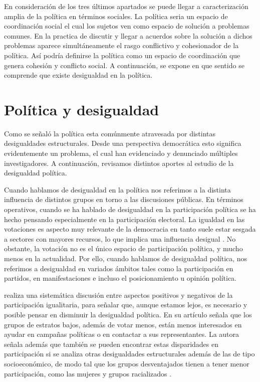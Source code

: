 \documentclass[12pt,twoside]{templates/facsothesis}
\begin{document}
En consideración de los tres últimos apartados se puede llegar a caracterización amplia de la política en términos sociales. La política seria un espacio de coordinación social el cual los sujetos ven como espacio de solución a problemas comunes. En la practica de discutir y llegar a acuerdos sobre la solución a dichos problemas aparece simultáneamente el rasgo conflictivo y cohesionador de la política. Así podría definirse la política como un espacio de coordinación que genera cohesión y conflicto social. A continuación, se expone en que sentido se comprende que existe desigualdad en la política.

\hypertarget{poluxedtica-y-desigualdad}{%
\section{Política y desigualdad}\label{poluxedtica-y-desigualdad}}

Como se señaló la política esta comúnmente atravesada por distintas desigualdades estructurales. Desde una perspectiva democrática esto significa evidentemente un problema, el cual han evidenciado y denunciado múltiples investigadores. A continuación, revisamos distintos aportes al estudio de la desigualdad política.

Cuando hablamos de desigualdad en la política nos referimos a la distinta influencia de distintos grupos en torno a las discusiones públicas. En términos operativos, cuando se ha hablado de desigualdad en la participación política se ha hecho pensando especialmente en la participación electoral. La igualdad en las votaciones es aspecto muy relevante de la democracia en tanto suele estar sesgada a sectores con mayores recursos, lo que implica una influencia desigual \citep{lijphart_Unequal_1997}. No obstante, la votación no es el único espacio de participación política, y mucho menos en la actualidad. Por ello, cuando hablamos de desigualdad política, nos referimos a desigualdad en variados ámbitos tales como la participación en partidos, en manifestaciones e incluso el posicionamiento u opinión política.

\citet{verba_Would_2003} realiza una sistemática discusión entre aspectos positivos y negativos de la participación igualitaria, para señalar que, aunque estamos lejos, es necesario y posible pensar en disminuir la desigualdad política. En su artículo \citet{verba_Would_2003} señala que los grupos de estratos bajos, además de votar menos, están menos interesados en ayudar en campañas políticas o en contactar a sus representantes. La autora señala además que también se pueden encontrar estas disparidades en participación si se analiza otras desigualdades estructurales además de las de tipo socioeconómico, de modo tal que los grupos desventajados tienen a tener menor participación, como las mujeres y grupos racializados \citep{desposato_Gender_2009, coffe_Explaining_2020, hutchings_CENTRALITY_2004}.
\end{document}

